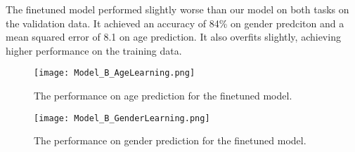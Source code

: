 The finetuned model performed slightly worse than our model on both tasks on the validation data.
It achieved an accuracy of 84\% on gender predciton and a mean squared error of 8.1 on age
prediction. It also overfits slightly, achieving higher performance on the training data.

\begin{figure}
    \centering
    \texttt{[image: Model\_B\_AgeLearning.png]}
    \caption{\label{fig:ModelBPerformanceAge} The performance on age prediction for the finetuned model.}
\end{figure}


\begin{figure}
    \centering
    \texttt{[image: Model\_B\_GenderLearning.png]}
    \caption{\label{fig:ModelBPerformanceGender} The performance on gender prediction for the finetuned model.}
\end{figure}